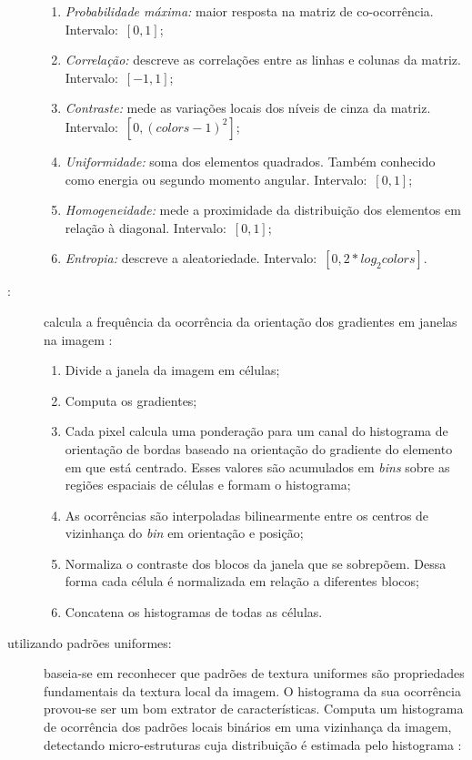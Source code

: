 \begin{description}
\begin{enumerate}
  \item \emph{Probabilidade máxima:} maior resposta na matriz de co-ocorrência. Intervalo:~$[0,1]$;
  \item \emph{Correlação:} descreve as correlações entre as linhas e colunas da matriz.\\ Intervalo:~$[-1,1]$;
  \item \emph{Contraste:} mede as variações locais dos níveis de cinza da matriz.\\ Intervalo:~$[0, (colors-1)^2]$;
  \item \emph{Uniformidade:} soma dos elementos quadrados. Também conhecido como energia ou segundo momento angular. Intervalo:~$[0,1]$;
  \item \emph{Homogeneidade:} mede a proximidade da distribuição dos elementos em relação à diagonal. Intervalo:~$[0,1]$;
  \item \emph{Entropia:} descreve a aleatoriedade. Intervalo:~$[0, 2*log_2 colors]$.
\end{enumerate}

\item [\sigla{HOG}{\textit{Histogram of Oriented Gradients}}:] calcula a frequência da ocorrência da orientação dos gradientes em janelas na imagem \cite{Dalal2005}:

\begin{enumerate}
  \item Divide a janela da imagem em células;
  \item Computa os gradientes;
  \item Cada pixel calcula uma ponderação para um canal do histograma de orientação de bordas baseado na orientação do gradiente do elemento em que está centrado. Esses valores são acumulados em \textit{bins} sobre as regiões espaciais de células e formam o histograma;
  \item As ocorrências são interpoladas bilinearmente entre os centros de vizinhança do \textit{bin} em orientação e posição;
  \item Normaliza o contraste dos blocos da janela que se sobrepõem. Dessa forma cada célula é normalizada em relação a diferentes blocos;
  \item Concatena os histogramas de todas as células.
\end{enumerate}

\item [\sigla{LBP}{\textit{Local Binary Patterns}} utilizando padrões uniformes:] baseia-se em reconhecer que padrões de textura uniformes são propriedades fundamentais da textura local da imagem. O histograma da sua ocorrência provou-se ser um bom extrator de características. Computa um histograma de ocorrência dos padrões locais binários em uma vizinhança da imagem, detectando micro-estruturas cuja distribuição é estimada pelo histograma \cite{Ojala2002}:


\end{description}
